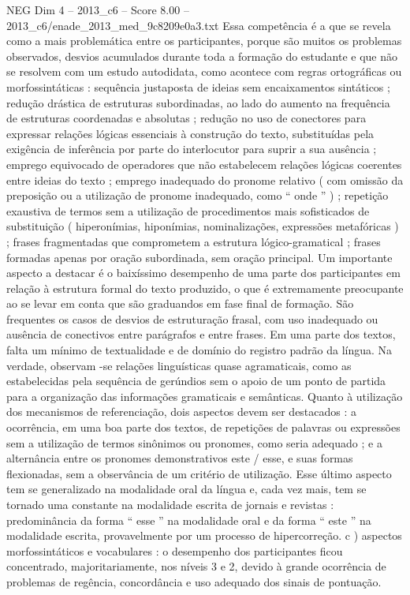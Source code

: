 \begin{textsample}{NEG Dim 4 – 2013\_c6 – Score 8.00 – 2013\_c6/enade\_2013\_med\_9c8209e0a3.txt}
Essa competência é a que se revela como a mais problemática entre os participantes, porque são muitos os problemas observados, desvios acumulados durante toda a formação do estudante e que não se resolvem com um estudo autodidata, como acontece com regras ortográficas ou morfossintáticas : sequência justaposta de ideias sem encaixamentos sintáticos ; redução drástica de estruturas subordinadas, ao lado do aumento na frequência de estruturas coordenadas e absolutas ; redução no uso de conectores para expressar relações lógicas essenciais à construção do texto, substituídas pela exigência de inferência por parte do interlocutor para suprir a sua ausência ; emprego equivocado de operadores que não estabelecem relações lógicas coerentes entre ideias do texto ; emprego inadequado do pronome relativo ( com omissão da preposição ou a utilização de pronome inadequado, como “ onde ” ) ; repetição exaustiva de termos sem a utilização de procedimentos mais sofisticados de substituição ( hiperonímias, hiponímias, nominalizações, expressões metafóricas ) ; frases fragmentadas que comprometem a estrutura lógico-gramatical ; frases formadas apenas por oração subordinada, sem oração principal.
Um importante aspecto a destacar é o baixíssimo desempenho de uma parte dos participantes em relação à estrutura formal do texto produzido, o que é extremamente preocupante ao se levar em conta que são graduandos em fase final de formação.
São frequentes os casos de desvios de estruturação frasal, com uso inadequado ou ausência de conectivos entre parágrafos e entre frases.
Em uma parte dos textos, falta um mínimo de textualidade e de domínio do registro padrão da língua.
Na verdade, observam -se relações linguísticas quase agramaticais, como as estabelecidas pela sequência de gerúndios sem o apoio de um ponto de partida para a organização das informações gramaticais e semânticas.
Quanto à utilização dos mecanismos de referenciação, dois aspectos devem ser destacados : a ocorrência, em uma boa parte dos textos, de repetições de palavras ou expressões sem a utilização de termos sinônimos ou pronomes, como seria adequado ; e a alternância entre os pronomes demonstrativos este / esse, e suas formas flexionadas, sem a observância de um critério de utilização.
Esse último aspecto tem se generalizado na modalidade oral da língua e, cada vez mais, tem se tornado uma constante na modalidade escrita de jornais e revistas : predominância da forma “ esse ” na modalidade oral e da forma “ este ” na modalidade escrita, provavelmente por um processo de hipercorreção. c ) aspectos morfossintáticos e vocabulares : o desempenho dos participantes ficou concentrado, majoritariamente, nos níveis 3 e 2, devido à grande ocorrência de problemas de regência, concordância e uso adequado dos sinais de pontuação.

\end{textsample}
